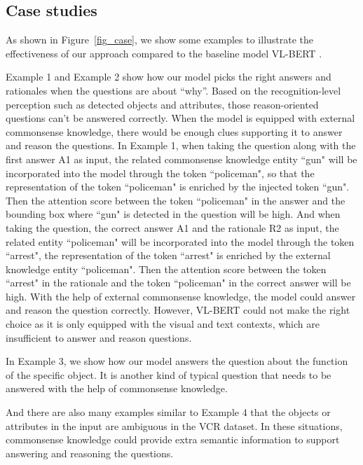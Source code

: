 \documentclass[conference]{IEEEtran}
\begin{document}
 
 








\subsection{Case studies}\label{case study}
As shown in Figure~\ref{fig_case}, we show some examples to illustrate the effectiveness of our approach compared to the baseline model VL-BERT \cite{b14}.






Example 1 and Example 2 show how our model picks the right answers and rationales when the questions are about “why”. Based on the recognition-level perception such as detected objects and attributes, those reason-oriented questions can't be answered correctly. When the model is equipped with external commonsense knowledge, there would be enough clues supporting it to answer and reason the questions. In Example 1, when taking the question along with the first answer A1 as input, the related commonsense knowledge entity “gun" will be incorporated into the model through the token “policeman", so that the representation of the token “policeman" is enriched by the injected token “gun". Then the attention score between the token “policeman" in the answer and the bounding box where “gun" is detected in the question will be high. And when taking the question, the correct answer A1 and the rationale R2 as input, the related entity “policeman" will be incorporated into the model through the token “arrest", the representation of the token “arrest" is enriched by the external knowledge entity “policeman". Then the attention score between the token “arrest" in the rationale and the token “policeman" in the correct answer will be high. With the help of external commonsense knowledge, the model could answer and reason the question correctly. However, VL-BERT could not make the right choice as it is only equipped with the visual and text contexts, which are insufficient to answer and reason questions.




In Example 3, we show how our model answers the question about the function of the specific object. It is another kind of typical question that needs to be answered with the help of commonsense knowledge. 


And there are also many examples similar to Example 4 that the objects or attributes in the input are ambiguous in the VCR dataset. In these situations, commonsense knowledge could provide extra semantic information to support answering and reasoning the questions.
\end{document}
